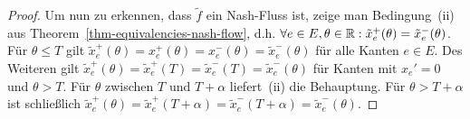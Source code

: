 \begin{proof}
	Um nun zu erkennen, dass $\tilde{f}$ ein Nash-Fluss ist, zeige man Bedingung~(ii) aus Theorem~\ref{thm-equivalencies-nash-flow}, d.h. $\forall e\in E, \theta\in\mathbb{R}: \tilde{x}_e^+(\theta) = \tilde{x}_e^-(\theta)$.
	Für $\theta \leq T$ gilt $\tilde{x}_e^+(\theta) = x_e^+(\theta) = x_e^-(\theta) = \tilde{x}_e^-(\theta)$ für alle Kanten $e\in E$.
	Des Weiteren gilt $\tilde{x}_e^+(\theta) = \tilde{x}_e^+(T) = \tilde{x}_e^-(T) = \tilde{x}_e^-(\theta)$ für Kanten mit $x_{e}' = 0$ und $\theta > T$.
	Für $\theta$ zwischen $T$ und $T+\alpha$ liefert~(ii) die Behauptung.
	Für $\theta > T+\alpha$ ist schließlich $\tilde{x}_e^+(\theta) = \tilde{x}_e^+(T + \alpha) = \tilde{x}_e^-(T+\alpha) = \tilde{x}_e^-(\theta)$.
\end{proof}

\begin{example}\label{ex-labels}
\end{example}